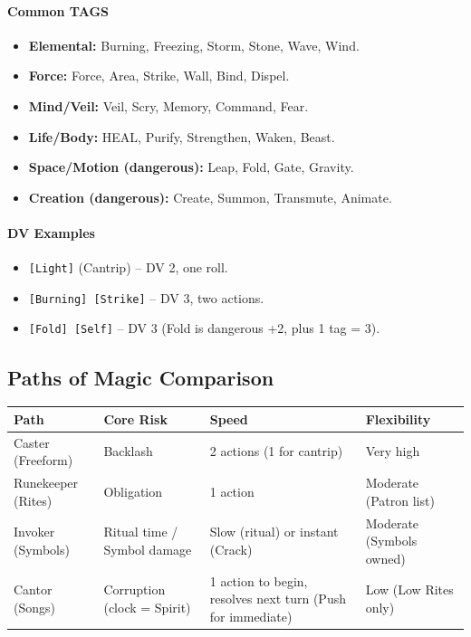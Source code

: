 \paragraph{Common TAGS}
\begin{itemize}[leftmargin=*]
  \item \textbf{Elemental:} Burning, Freezing, Storm, Stone, Wave, Wind.
  \item \textbf{Force:} Force, Area, Strike, Wall, Bind, Dispel.
  \item \textbf{Mind/Veil:} Veil, Scry, Memory, Command, Fear.
  \item \textbf{Life/Body:} HEAL, Purify, Strengthen, Waken, Beast.
  \item \textbf{Space/Motion (dangerous):} Leap, Fold, Gate, Gravity.
  \item \textbf{Creation (dangerous):} Create, Summon, Transmute, Animate.
\end{itemize}

\paragraph{DV Examples}
\begin{itemize}
  \item \texttt{[Light]} (Cantrip) -- DV 2, one roll.
  \item \texttt{[Burning] [Strike]} -- DV 3, two actions.
  \item \texttt{[Fold] [Self]} -- DV 3 (Fold is dangerous +2, plus 1 tag = 3).
\end{itemize}

\subsection{Paths of Magic Comparison}
\begin{center}
\small
\begin{tabularx}{\textwidth}{l l l l}
\toprule
\textbf{Path} & \textbf{Core Risk} & \textbf{Speed} & \textbf{Flexibility} \\
\midrule
Caster (Freeform) & Backlash & 2 actions (1 for cantrip) & Very high \\
Runekeeper (Rites) & Obligation & 1 action & Moderate (Patron list) \\
Invoker (Symbols) & Ritual time / Symbol damage & Slow (ritual) or instant (Crack) & Moderate (Symbols owned) \\
Cantor (Songs) & Corruption (clock = Spirit) & 1 action to begin, resolves next turn (Push for immediate) & Low (Low Rites only) \\
\bottomrule
\end{tabularx}
\end{center}